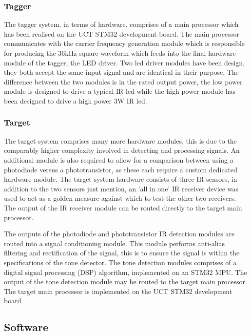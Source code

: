 \subsubsection{Tagger}
The tagger system, in terms of hardware, comprises of a main processor which has been realised on the UCT STM32\footnotemark{} development board. The main processor communicates with the carrier frequency generation module which is responsible for producing the 36kHz square waveform which feeds into the final hardware module of the tagger, the LED driver. Two led driver modules have been design, they both accept the same input signal and are identical in their purpose. The difference between the two modules is in the rated output power, the low power module is designed to drive a typical IR led while the high power module has been designed to drive a high power 3W IR led.


\subsubsection{Target}
The target system comprises many more hardware modules, this is due to the comparably higher complexity involved in detecting and processing signals. An additional module is also required to allow for a comparison between using a photodiode versus a phototransistor, as these each require a custom dedicated hardware module. The target system hardware consists of three IR sensors, in addition to the two sensors just mention, an 'all in one' IR receiver device was used to act as a golden measure against which to test the other two receivers. The output of the IR receiver module can be routed directly to the target main processor.

The outputs of the photodiode and phototransistor IR detection modules are routed into a signal conditioning module. This module performs anti-alias filtering and rectification of the signal, this is to ensure the signal is within the specifications of the tone detector. The tone detection modules comprises of a digital signal processing (DSP) algorithm, implemented on an STM32 MPU. The output of the tone detection module may be routed to the target main processor. The target main processor is implemented on the UCT STM32 development board.

\subsection{Software}

